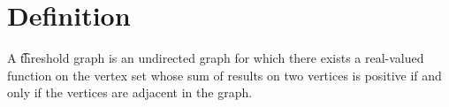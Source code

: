 

\section*{Definition}

A \t{threshold graph} is an undirected graph for which there exists a real-valued function on the vertex set whose sum of results on two vertices is positive if and only if the vertices are adjacent in the graph.
